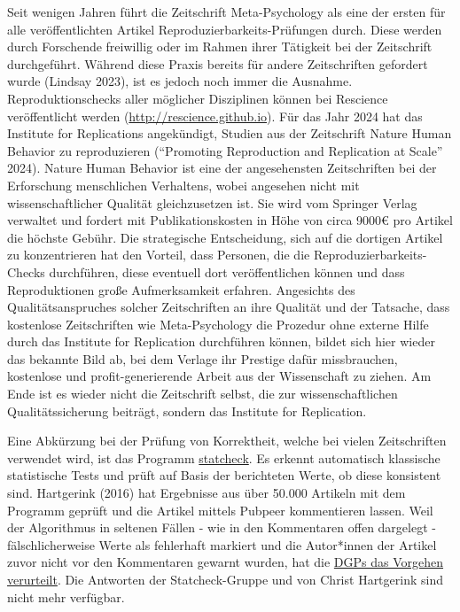 \documentclass[
  letterpaper,
  DIV=11,
  numbers=noendperiod]{scrreprt}
\begin{document}
Seit wenigen Jahren führt die Zeitschrift Meta-Psychology als eine der
ersten für alle veröffentlichten Artikel Reproduzierbarkeits-Prüfungen
durch. Diese werden durch Forschende freiwillig oder im Rahmen ihrer
Tätigkeit bei der Zeitschrift durchgeführt. Während diese Praxis bereits
für andere Zeitschriften gefordert wurde (Lindsay 2023), ist es jedoch
noch immer die Ausnahme. Reproduktionschecks aller möglicher Disziplinen
können bei Rescience veröffentlicht werden
(\url{http://rescience.github.io}). Für das Jahr 2024 hat das Institute
for Replications angekündigt, Studien aus der Zeitschrift Nature Human
Behavior zu reproduzieren ({``Promoting Reproduction and Replication at
Scale''} 2024). Nature Human Behavior ist eine der angesehensten
Zeitschriften bei der Erforschung menschlichen Verhaltens, wobei
angesehen nicht mit wissenschaftlicher Qualität gleichzusetzen ist. Sie
wird vom Springer Verlag verwaltet und fordert mit Publikationskosten in
Höhe von circa 9000€ pro Artikel die höchste Gebühr. Die strategische
Entscheidung, sich auf die dortigen Artikel zu konzentrieren hat den
Vorteil, dass Personen, die die Reproduzierbarkeits-Checks durchführen,
diese eventuell dort veröffentlichen können und dass Reproduktionen
große Aufmerksamkeit erfahren. Angesichts des Qualitätsanspruches
solcher Zeitschriften an ihre Qualität und der Tatsache, dass kostenlose
Zeitschriften wie Meta-Psychology die Prozedur ohne externe Hilfe durch
das Institute for Replication durchführen können, bildet sich hier
wieder das bekannte Bild ab, bei dem Verlage ihr Prestige dafür
missbrauchen, kostenlose und profit-generierende Arbeit aus der
Wissenschaft zu ziehen. Am Ende ist es wieder nicht die Zeitschrift
selbst, die zur wissenschaftlichen Qualitätssicherung beiträgt, sondern
das Institute for Replication.

Eine Abkürzung bei der Prüfung von Korrektheit, welche bei vielen
Zeitschriften verwendet wird, ist das Programm
\href{statcheck.io}{statcheck}. Es erkennt automatisch klassische
statistische Tests und prüft auf Basis der berichteten Werte, ob diese
konsistent sind. Hartgerink (2016) hat Ergebnisse aus über 50.000
Artikeln mit dem Programm geprüft und die Artikel mittels Pubpeer
kommentieren lassen. Weil der Algorithmus in seltenen Fällen - wie in
den Kommentaren offen dargelegt - fälschlicherweise Werte als fehlerhaft
markiert und die Autor*innen der Artikel zuvor nicht vor den Kommentaren
gewarnt wurden, hat die
\href{https://www.dgps.de/schwerpunkte/stellungnahmen-und-empfehlungen/stellungnahmen/details/stellungnahme-des-dgps-vorstands-zur-praxis-der-automatischen-plausibilitaetsueberpruefung-wissenschaftlicher-arbeiten-mit-statcheck/}{DGPs
das Vorgehen verurteilt}. Die Antworten der Statcheck-Gruppe und von
Christ Hartgerink sind nicht mehr verfügbar.
\end{document}
